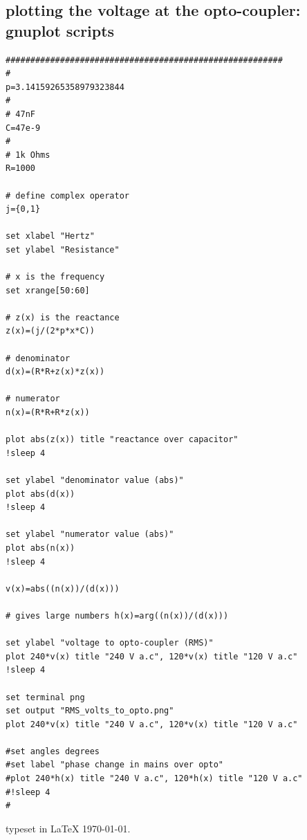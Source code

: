 \documentclass[a4paper,10pt]{article}
\begin{document}
\clearpage

\subsection{plotting the voltage at the opto-coupler: gnuplot scripts}
 
{ \tiny
\begin{verbatim}
########################################################
#
p=3.14159265358979323844
#
# 47nF
C=47e-9
#
# 1k Ohms
R=1000

# define complex operator
j={0,1}

set xlabel "Hertz"
set ylabel "Resistance"

# x is the frequency
set xrange[50:60]

# z(x) is the reactance
z(x)=(j/(2*p*x*C))

# denominator
d(x)=(R*R+z(x)*z(x))

# numerator
n(x)=(R*R+R*z(x))

plot abs(z(x)) title "reactance over capacitor"
!sleep 4

set ylabel "denominator value (abs)"
plot abs(d(x))
!sleep 4

set ylabel "numerator value (abs)"
plot abs(n(x))
!sleep 4

v(x)=abs((n(x))/(d(x)))

# gives large numbers h(x)=arg((n(x))/(d(x)))

set ylabel "voltage to opto-coupler (RMS)"
plot 240*v(x) title "240 V a.c", 120*v(x) title "120 V a.c"
!sleep 4

set terminal png
set output "RMS_volts_to_opto.png"
plot 240*v(x) title "240 V a.c", 120*v(x) title "120 V a.c"

#set angles degrees
#set label "phase change in mains over opto"
#plot 240*h(x) title "240 V a.c", 120*h(x) title "120 V a.c"
#!sleep 4
#
\end{verbatim}


}
% 
% 
% 
% 
typeset in {\Huge \LaTeX} \today.
 
\end{document}

